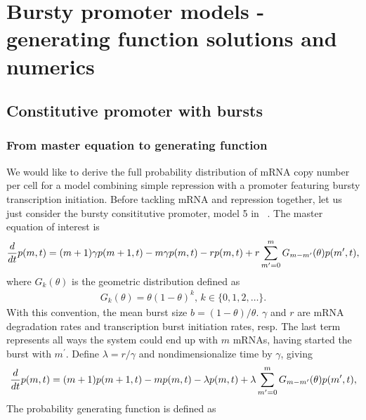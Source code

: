 \section{Bursty promoter models - generating function solutions and numerics}
\label{sec:gen_fcn_appdx}

\subsection{Constitutive promoter with bursts}

\subsubsection{From master equation to generating function}

We would like to derive the full probability distribution of
mRNA copy number per cell for a model combining simple repression
with a promoter featuring bursty transcription initiation.
Before tackling mRNA and repression together, let us
just consider the bursty consititutive promoter,
model 5 in~
.
The master equation of interest is
\begin{align}
\frac{d {}}{d t}p(m,t) = (m+1)\gamma p(m+1,t) - m\gamma p(m,t) - r p(m,t)
        + r \sum_{m^\prime=0}^m G_{m-m^\prime}(\theta) p(m^\prime,t),
\label{eq:1state_unreg_003}
\end{align}
where $G_{k}(\theta)$ is the geometric distribution defined as
\begin{align}
G_{k}(\theta) = \theta(1 - \theta)^k, \, k\in\{0,1,2,\dots\}.
\end{align}
With this convention, the mean burst size $b = (1-\theta)/\theta$.
$\gamma$ and $r$ are mRNA degradation rates and transcription burst
initiation rates, resp. The last term represents all ways the system could
end up with $m$ mRNAs, having started the burst with $m^\prime$. Define
$\lambda = r/\gamma$ and nondimensionalize time by $\gamma$, giving
\begin{align}
\frac{d {}}{d t}p(m,t) = (m+1)p(m+1,t) - m p(m,t) - \lambda p(m,t)
        + \lambda \sum_{m^\prime=0}^m G_{m-m^\prime}(\theta) p(m^\prime,t),
\end{align}
The probability generating function is defined as
